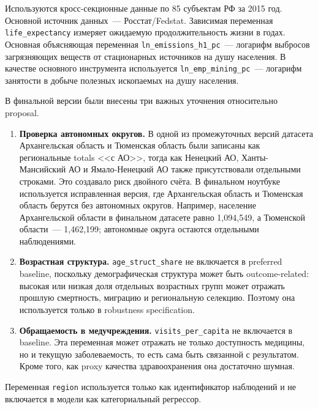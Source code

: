 \documentclass[10pt,a4paper]{article}
\begin{document}
Используются кросс-секционные данные по 85 субъектам РФ за 2015 год. Основной источник данных~--- Росстат/Fedstat. Зависимая переменная \texttt{life\_expectancy} измеряет ожидаемую продолжительность жизни в годах. Основная объясняющая переменная \texttt{ln\_emissions\_h1\_pc}~--- логарифм выбросов загрязняющих веществ от стационарных источников на душу населения. В качестве основного инструмента используется \texttt{ln\_emp\_mining\_pc}~--- логарифм занятости в добыче полезных ископаемых на душу населения.

В финальной версии были внесены три важных уточнения относительно proposal.

\begin{enumerate}
  \item \textbf{Проверка автономных округов.} В одной из промежуточных версий датасета Архангельская область и Тюменская область были записаны как региональные totals <<с АО>>, тогда как Ненецкий АО, Ханты-Мансийский АО и Ямало-Ненецкий АО также присутствовали отдельными строками. Это создавало риск двойного счёта. В финальном ноутбуке используется исправленная версия, где Архангельская область и Тюменская область берутся без автономных округов. Например, население Архангельской области в финальном датасете равно 1{,}094{,}549, а Тюменской области~--- 1{,}462{,}199; автономные округа остаются отдельными наблюдениями.
  \item \textbf{Возрастная структура.} \texttt{age\_struct\_share} не включается в preferred baseline, поскольку демографическая структура может быть outcome-related: высокая или низкая доля отдельных возрастных групп может отражать прошлую смертность, миграцию и региональную селекцию. Поэтому она используется только в robustness specification.
  \item \textbf{Обращаемость в медучреждения.} \texttt{visits\_per\_capita} не включается в baseline. Эта переменная может отражать не только доступность медицины, но и текущую заболеваемость, то есть сама быть связанной с результатом. Кроме того, как proxy качества здравоохранения она достаточно шумная.
\end{enumerate}

Переменная \texttt{region} используется только как идентификатор наблюдений и не включается в модели как категориальный регрессор.
\end{document}
